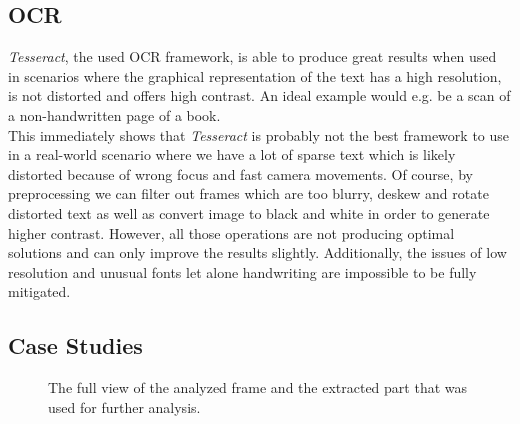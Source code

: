 \subsection{OCR}
\emph{Tesseract}, the used OCR framework, is able to produce great results when used in scenarios where the graphical representation of the text has a high resolution, is not distorted and offers high contrast.
An ideal example would e.g. be a scan of a non-handwritten page of a book. \\
This immediately shows that \emph{Tesseract} is probably not the best framework to use in a real-world scenario where we have a lot of sparse text which is likely distorted because of wrong focus and fast camera movements. 
Of course, by preprocessing we can filter out frames which are too blurry, deskew and rotate distorted text as well as convert image to black and white in order to generate higher contrast. 
However, all those operations are not producing optimal solutions and can only improve the results slightly. 
Additionally, the issues of low resolution and unusual fonts let alone handwriting are impossible to be fully mitigated. 

\subsection{Case Studies}

\begin{figure}[htpb]
  \centering
  \quad
  \caption{The full view of the analyzed frame and the extracted part that was used for further analysis.}\label{fig:example-frame}
\end{figure}

